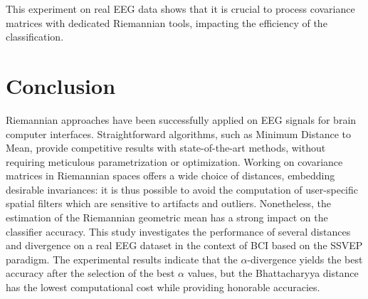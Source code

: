 This experiment on real EEG data shows that it is crucial to process covariance matrices with dedicated Riemannian tools, impacting the efficiency of the classification. 


\section{Conclusion}
\label{sec:conclusion}

Riemannian approaches have been successfully applied on EEG signals for brain computer interfaces. 
Straightforward algorithms, such as Minimum Distance to Mean, provide competitive results with state-of-the-art methods, without requiring meticulous parametrization or optimization.
Working on covariance matrices in Riemannian spaces offers a wide choice of distances, embedding desirable invariances: it is thus possible to avoid the computation of user-specific spatial filters which are sensitive to artifacts and outliers.
Nonetheless, the estimation of the Riemannian geometric mean has a strong impact on the classifier accuracy.
This study investigates the performance of several distances and divergence on a real EEG dataset in the context of BCI based on the SSVEP paradigm.
The experimental results indicate that the $\alpha$-divergence yields the best accuracy after the selection of the best $\alpha$ values, but the Bhattacharyya distance has the lowest computational cost while providing honorable accuracies.

\vspace{6pt} 




